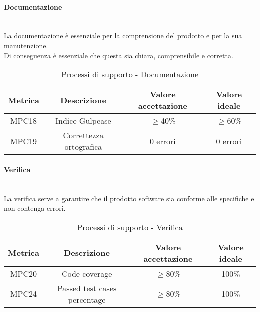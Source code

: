 \documentclass[10pt]{article}
\begin{document}
\begin{justify}
\paragraph{Documentazione}\mbox{}\\
La documentazione è essenziale per la comprensione del prodotto e per la sua manutenzione.\\
Di conseguenza è essenziale che questa sia chiara, comprensibile e corretta.\\
\begin{table}[H]
  \centering
\begin{tabular}{|c|c|c|c|}
  \hline
  \textbf{Metrica} & \textbf{Descrizione} & \textbf{Valore accettazione} & \textbf{Valore ideale}\\
  \hline
  MPC18 & Indice Gulpease & $\geq$40\% & $\geq$60\% \\
  \hline
  MPC19 & Correttezza ortografica & 0 errori & 0 errori \\
  \hline
\end{tabular}
\caption{Processi di supporto - Documentazione}
\label{tab:documentazione}
\end{table}

\paragraph{Verifica}\mbox{}\\
La verifica serve a garantire che il prodotto software sia conforme alle specifiche e non contenga errori.\\
\begin{table}[H]
  \centering
\begin{tabular}{|c|c|c|c|}
  \hline
  \textbf{Metrica} & \textbf{Descrizione} & \textbf{Valore accettazione} & \textbf{Valore ideale}\\
  \hline
  MPC20 & Code coverage & $\geq$80\% & 100\% \\
  \hline
  MPC24 & Passed test cases percentage & $\geq$80\% & 100\% \\
  \hline
\end{tabular}
\caption{Processi di supporto - Verifica}
\label{tab:verifica}
\end{table}


\end{justify}
\end{document}

